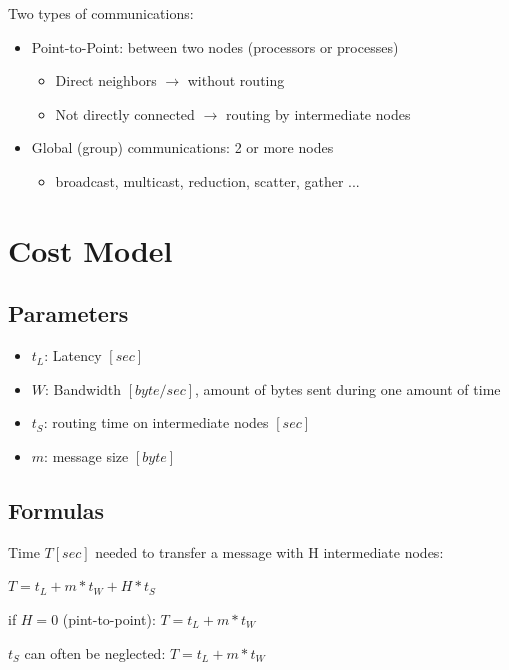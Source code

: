 \documentclass[11pt,a4paper]{report}
\begin{document}
Two types of communications:

\begin{itemize}
    \item Point-to-Point: between two nodes (processors or processes)
        \begin{itemize}
            \item Direct neighbors \(\rightarrow\) without routing
            \item Not directly connected \(\rightarrow\) routing by 
            intermediate nodes
        \end{itemize}
        
    \item Global (group) communications: 2 or more nodes
        \begin{itemize}
            \item broadcast, multicast, reduction, scatter, gather ...
        \end{itemize}
\end{itemize}

\section{Cost Model}

\subsection{Parameters}


\begin{itemize}
    \item \(t_{L}\): Latency \([sec]\)
    \item \(W\): Bandwidth \([byte/sec]\), amount of bytes sent during one 
    amount of time
    \item \(t_{S}\): routing time on intermediate nodes \([sec]\)
    \item \(m\): message size \([byte]\)
\end{itemize}


\subsection{Formulas}

Time \(T [sec]\) needed to transfer a message with H intermediate nodes:

\(T = t_{L} + m * t_{W} + H * t_{S}\)

if \(H=0\) (pint-to-point): \(T = t_{L} + m * t_{W}\)

\(t_{S}\) can often be neglected: \(T = t_{L} + m * t_{W}\)
\end{document}
